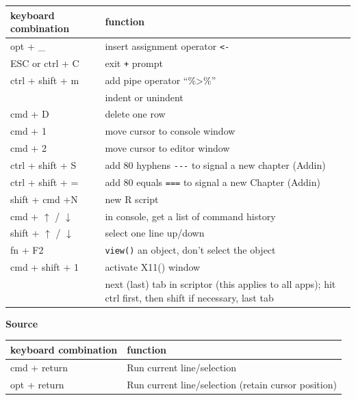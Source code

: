 \documentclass[
]{book}
\begin{document}
\begin{longtable}[]{@{}
  >{\raggedright\arraybackslash}p{}
  >{\raggedright\arraybackslash}p{}@{}}
\toprule\noalign{}
\begin{minipage}[b]{\linewidth}\raggedright
keyboard combination
\end{minipage} & \begin{minipage}[b]{\linewidth}\raggedright
function
\end{minipage} \\
\midrule\noalign{}
\endhead
\bottomrule\noalign{}
\endlastfoot
opt + \_ & insert assignment operator \texttt{\textless{}-} \\
ESC or ctrl + C & exit \texttt{+} prompt \\
ctrl + shift + m & add pipe operator ``\%\textgreater\%'' \\
{ctrl + \texttt{{[}}/\texttt{{]}}} & indent or unindent \\
cmd + D & delete one row \\
cmd + 1 & move cursor to console window \\
cmd + 2 & move cursor to editor window \\
ctrl + shift + S & add 80 hyphens \texttt{-\/-\/-} to signal a new chapter (Addin) \\
ctrl + shift + = & add 80 equals \texttt{===} to signal a new Chapter (Addin) \\
shift + cmd +N & new R script \\
cmd + \(\uparrow\) / \(\downarrow\) & in console, get a list of command history \\
shift + \(\uparrow\) / \(\downarrow\) & select one line up/down \\
fn + F2 & \texttt{view()} an object, don't select the object \\
cmd + shift + 1 & activate X11() window \\
{ctrl (+ shift) + tab} & next (last) tab in scriptor (this applies to all apps); hit ctrl first, then shift if necessary, last tab \\
\end{longtable}

{\textbf{Source}}

\begin{longtable}[]{@{}
  >{\raggedright\arraybackslash}p{}
  >{\raggedright\arraybackslash}p{}@{}}
\toprule\noalign{}
\begin{minipage}[b]{\linewidth}\raggedright
keyboard combination
\end{minipage} & \begin{minipage}[b]{\linewidth}\raggedright
function
\end{minipage} \\
\midrule\noalign{}
\endhead
\bottomrule\noalign{}
\endlastfoot
cmd + return & Run current line/selection \\
opt + return & Run current line/selection (retain cursor position) \\
\end{longtable}
\end{document}
